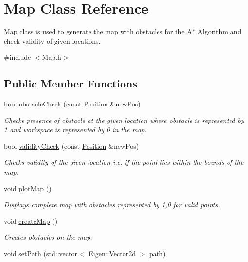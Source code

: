 \hypertarget{classMap}{}\section{Map Class Reference}
\label{classMap}


\hyperlink{classMap}{Map} class is used to generate the map with obstacles for the A$\ast$ Algorithm and check validity of given locations.  




{\ttfamily \#include $<$Map.\+h$>$}

\subsection*{Public Member Functions}
\begin{DoxyCompactItemize}
\item 
bool \hyperlink{classMap_af39ac88e2c0f961c60e95b3f7dd00602}{obstacle\+Check} (const \hyperlink{structPosition}{Position} \&new\+Pos)
\begin{DoxyCompactList}\small\item\em Checks presence of obstacle at the given location where obstacle is represented by \textquotesingle{}1\textquotesingle{} and workspace is represented by \textquotesingle{}0\textquotesingle{} in the map. \end{DoxyCompactList}\item 
bool \hyperlink{classMap_a4d4d1d84c2888a7233cf9174b45c0a11}{validity\+Check} (const \hyperlink{structPosition}{Position} \&new\+Pos)
\begin{DoxyCompactList}\small\item\em Checks validity of the given location i.\+e. if the point lies within the bounds of the map. \end{DoxyCompactList}\item 
void \hyperlink{classMap_a6882934f9d1877bca051a212ee3f754c}{plot\+Map} ()
\begin{DoxyCompactList}\small\item\em Displays complete map with obstacles represented by 1,0 for valid points. \end{DoxyCompactList}\item 
void \hyperlink{classMap_ab01b5945ae722908864a3208939928d1}{create\+Map} ()
\begin{DoxyCompactList}\small\item\em Creates obstacles on the map. \end{DoxyCompactList}\item 
void \hyperlink{classMap_ade005914937328a33141f3aa0e121bec}{set\+Path} (std\+::vector$<$ Eigen\+::\+Vector2d $>$ path)
\end{DoxyCompactItemize}


